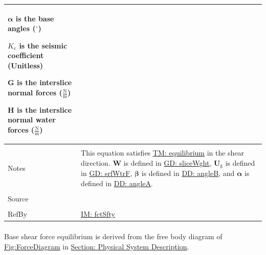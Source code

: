 \documentclass[12pt]{article}
\begin{document}
\begin{minipage}{\textwidth}
\begin{tabular}{>{\raggedright}p{}>{\raggedright\arraybackslash}p{}}
\begin{symbDescription}
              \item{$\mathbf{α}$ is the base angles (${}^{\circ}$)}
              \item{${K_{\text{c}}}$ is the seismic coefficient (Unitless)}
              \item{$\mathbf{G}$ is the interslice normal forces ($\frac{\text{N}}{\text{m}}$)}
              \item{$\mathbf{H}$ is the interslice normal water forces ($\frac{\text{N}}{\text{m}}$)}
              \end{symbDescription}
\\ \midrule \\
Notes & This equation satisfies \hyperref[TM:equilibrium]{TM: equilibrium} in the shear direction. $\mathbf{W}$ is defined in \hyperref[GD:sliceWght]{GD: sliceWght}, ${\mathbf{U}_{\text{g}}}$ is defined in \hyperref[GD:srfWtrF]{GD: srfWtrF}, $\mathbf{β}$ is defined in \hyperref[DD:angleB]{DD: angleB}, and $\mathbf{α}$ is defined in \hyperref[DD:angleA]{DD: angleA}.
        
\\ \midrule \\
Source & \cite{chen2005}
         
\\ \midrule \\
RefBy & \hyperref[IM:fctSfty]{IM: fctSfty}
        
\\ \bottomrule
\end{tabular}
\end{minipage}
\paragraph{}
\label{GD:bsShrFEqDeriv}
Base shear force equilibrium is derived from the free body diagram of \hyperref[Figure:ForceDiagram]{Fig:ForceDiagram} in \hyperref[Sec:PhysSyst]{Section: Physical System Description}.
\end{document}
